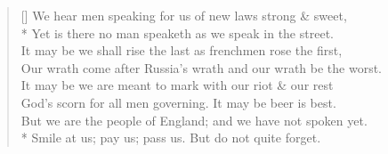 \documentclass[MAIN]{subfiles}
\begin{document}
\begin{verse}[\versewidth]
We hear men speaking for us of new laws strong \& sweet,\\*
Yet is there no man speaketh as we speak in the street.\\
It may be we shall rise the last as frenchmen rose the first,\\
Our wrath come after Russia's wrath and our wrath be the worst.\\
It may be we are meant to mark with our riot \& our rest\\
God's scorn for all men governing. It may be beer is best.\\
But we are the people of England; and we have not spoken yet.\\*
Smile at us; pay us; pass us. But do not quite forget.
\end{verse}
\end{document}
